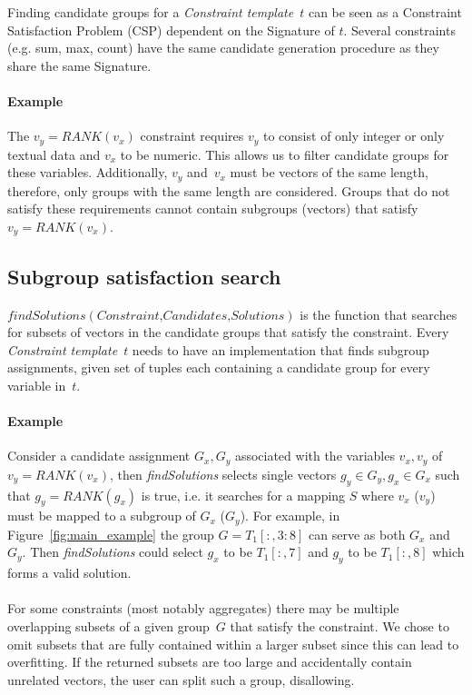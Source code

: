 \documentclass{ecai}
\newcommand{\format}[1]{\textit{#1}\xspace}
\newcommand{\findassignment}{\format{findSolutions}}
\newcommand{\template}{\format{Constraint template}}
\newcommand{\CSignature}{Signature\xspace}
\newcommand{\range}[3]{\ensuremath{#1[#2,#3]}}
\newcommand{\rangeto}[2]{#1{:}#2}
\newcommand{\rangeall}{:}
\newcommand{\eccalc}[2]{\ensuremath{#1 = #2}}
\newcommand{\ecrank}[2]{\eccalc{#1}{\mathit{RANK}(#2)}}
\begin{document}
Finding candidate groups for a \template~$t$ can be seen as a Constraint Satisfaction Problem (CSP) dependent on the \CSignature of $t$.
Several constraints (e.g. sum, max, count) have the same candidate generation procedure as they share the same \CSignature.

\paragraph{Example}
The \ecrank{v_y}{v_x} constraint requires $v_y$ to consist of only integer or only textual data and $v_x$ to be numeric.
This allows us to filter candidate groups for these variables.
Additionally, $v_y$ and~$v_x$ must be vectors of the same length, therefore, only groups with the same length are considered.
Groups that do not satisfy these requirements cannot contain subgroups (vectors) that satisfy \ecrank{v_y}{v_x}.

\subsection{Subgroup satisfaction search}
$\findassignment(\textit{Constraint,Candidates,Solutions})$ is the function that searches for subsets of vectors in the candidate groups that satisfy the constraint.
Every \template~$t$ needs to have an implementation that finds subgroup assignments, given set of tuples each containing a candidate group for every variable in~$t$.

\paragraph{Example}
Consider a candidate assignment $G_x, G_y$ associated with the variables $v_x,v_y$ of \ecrank{v_y}{v_x}, then \findassignment selects single vectors $g_y \in G_y, g_x \in G_x$ such that \ecrank{g_y}{g_x} is true, i.e. it searches for a mapping $S$ where $v_x$ ($v_y$) must be mapped to a subgroup of $G_x$ ($G_y$).
For example, in Figure~\ref{fig:main_example} the group $G = \range{T_1}{\rangeall}{\rangeto{3}{8}}$ can serve as both $G_x$ and $G_y$.
Then \findassignment could select $g_x$ to be $\range{T_1}{\rangeall}{7}$ and $g_y$ to be $\range{T_1}{\rangeall}{8}$ which forms a valid solution.
\\\\
For some constraints (most notably aggregates) there may be multiple overlapping subsets of a given group~$G$ that satisfy the constraint.
We chose to omit subsets that are fully contained within a larger subset since this can lead to overfitting.
If the returned subsets are too large and accidentally contain unrelated vectors, the user can split such a group, disallowing.
\end{document}
